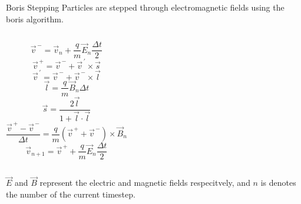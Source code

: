 \documentclass[aspectratio=169, 16pt]{beamer}
\begin{document}
\begin{frame}{Boris Stepping}
  \vfill{}
  \centering
  Particles are stepped through electromagnetic fields using the boris algorithm\cite{boris1970relativistic}.
  \vspace{0.25cm}
  \begin{columns}
      \begin{equation} \label{eq:e_half1} \vec{v}^{\,-}
        =
        \vec{v}_{n}
        +
        \frac{q}{m}
        \vec{E}_n
        \frac{\Delta t}{2}
      \end{equation}
      \begin{equation} \label{eq:boris_v_plus}
        \vec{v}^{\,+}
        =
        \vec{v}^{\,-}
        +
        \vec{v}^{\,'}
        \times
        \vec{s}
      \end{equation}
      \begin{equation} \label{eq:boris_v_prime}
        \vec{v}^{\,'}
        =
        \vec{v}^{\,-}
        +
        \vec{v}^{\,-}
        \times
        \vec{l}
      \end{equation}
      \begin{equation} \label{eq:boris_t}
        \vec{l} =
        \frac{q}{m}
        \vec{B}_n
        \Delta t
      \end{equation}
      \begin{equation} \label{eq:boris_s}
        \vec{s} =
        \frac{2 \vec{l}}{
          1 + \vec{l} \cdot \vec{l}
        }
      \end{equation}
      \begin{equation} \label{eq:mag_step}
        \frac{
          \vec{v}^{\,+}
          -
          \vec{v}^{\,-}
        }{ \Delta t}
        =
        \frac{q}{m}
        \left(
          \vec{v}^{\,+}
          +
          \vec{v}^{\,-}
        \right)
        \times
        \vec{B}_n
      \end{equation}
      \begin{equation} \label{eq:e_half2}
        \vec{v}_{n+1}
        =
        \vec{v}^{\,+}
        +
        \frac{q}{m}
        \vec{E}_n
        \frac{\Delta t}{2}
      \end{equation}
  \end{columns}
  \vspace{0.25cm}
  $\vec{E}$ and $\vec{B}$ represent the electric and magnetic fields respecitvely, and $n$ is denotes the number of the current timestep.
\end{frame}
\end{document}
